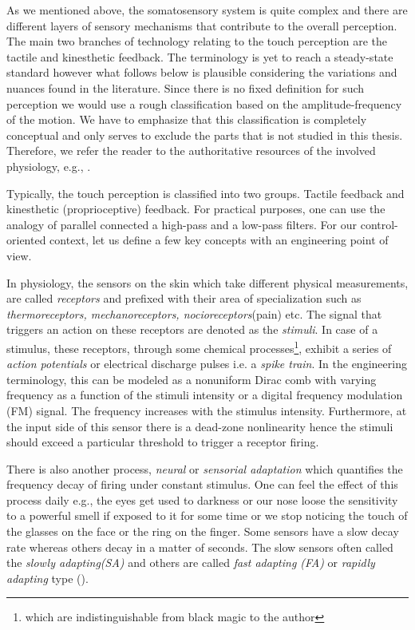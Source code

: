 As we mentioned above, the somatosensory system is quite complex and there are different layers of sensory mechanisms that contribute to the overall perception. The main two branches of technology relating to the touch perception are the tactile and kinesthetic  feedback. The terminology is yet to reach a steady-state standard however what follows below is plausible considering the variations and nuances found in the literature. Since there is no fixed definition for such perception we would use a rough  classification based on the amplitude-frequency of the motion. We have to emphasize that this classification is completely conceptual and only serves to exclude the parts that is not studied in this thesis. Therefore, we refer the reader to the authoritative resources of the involved physiology, e.g., \cite{kandel}. 

Typically, the touch perception is classified into two groups. Tactile feedback and kinesthetic (proprioceptive) feedback. For practical purposes, one can use the analogy of parallel connected a high-pass and a low-pass filters. For our control-oriented context, let us define a few key concepts with an engineering point of view. 

In physiology, the sensors on the skin which take different physical measurements, are called \emph{receptors} and prefixed with their area of specialization such as \emph{thermoreceptors, mechanoreceptors, nocioreceptors}(pain) etc. The signal that triggers an action on these receptors are denoted as the \emph{stimuli}. In case of a stimulus, these receptors, through some chemical processes\footnote{which are indistinguishable from black magic to the author}, exhibit a series of \emph{action potentials} or electrical discharge pulses i.e. a \emph{spike train}. In the engineering terminology, this can be modeled as a nonuniform Dirac comb with varying frequency as a function of the stimuli intensity or a digital frequency modulation (FM) signal. The frequency increases with the stimulus intensity. Furthermore, at the input side of this sensor there is a dead-zone nonlinearity hence the stimuli should exceed a particular threshold to trigger a receptor firing.

There is also another process, \emph{neural} or \emph{sensorial adaptation} which quantifies the frequency decay of firing under constant stimulus. One can feel the effect of this process daily e.g., the eyes get used to darkness or our nose loose the sensitivity to a powerful smell if exposed to it for some time or we stop noticing the touch of the glasses on the face or the ring on the finger. Some sensors have a slow decay rate whereas others decay in a matter of seconds. The slow sensors often called the \emph{slowly adapting(SA)} and others are called \emph{fast adapting (FA)} or \emph{rapidly adapting} type (\cite{burdea}).


